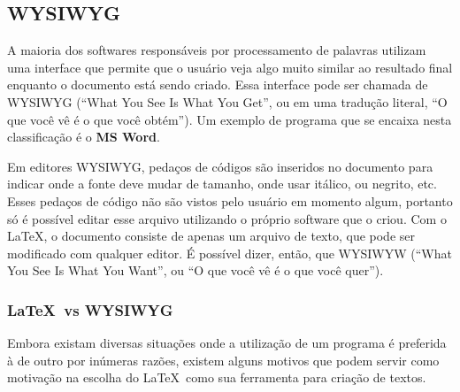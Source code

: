 \subsection{WYSIWYG}

A maioria dos softwares responsáveis por processamento de palavras utilizam uma interface que permite que o usuário veja algo muito similar ao resultado final enquanto o documento está sendo criado. Essa interface pode ser chamada de WYSIWYG (``What You See Is What You Get'', ou em uma tradução literal, ``O que você vê é o que você obtém''). Um exemplo de programa que se encaixa nesta classificação é o \textbf{MS Word}.

Em editores WYSIWYG, pedaços de códigos são inseridos no documento para indicar onde a fonte deve mudar de tamanho, onde usar itálico, ou negrito, etc. Esses pedaços de código não são vistos pelo usuário em momento algum, portanto só é possível editar esse arquivo utilizando o próprio software que o criou. Com o \LaTeX, o documento consiste de apenas um arquivo de texto, que pode ser modificado com qualquer editor. É possível dizer, então, que WYSIWYW (``What You See Is What You Want'', ou ``O que você vê é o que você quer'').

\subsubsection{\LaTeX\ vs WYSIWYG}%
Embora existam diversas situações onde a utilização de um programa é preferida à de outro por inúmeras razões, existem alguns motivos que podem servir como motivação na escolha do \LaTeX\ como sua ferramenta para criação de textos.

